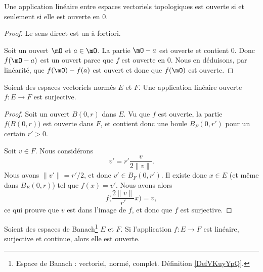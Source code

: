 \begin{lemma}
    Une application linéaire entre espaces vectoriels topologiques est ouverte si et seulement si elle est ouverte en \( 0\).
\end{lemma}

\begin{proof}
    Le sens direct est un à fortiori.

    Soit un ouvert \( \mO\) et \( a\in \mO\). La partie \( \mO-a\) est ouverte et contient \( 0\). Donc \( f(\mO-a)\) est un ouvert parce que \( f\) est ouverte en \( 0\). Nous en déduisons, par linéarité, que \( f(\mO)-f(a)\) est ouvert et donc que \( f(\mO)\) est ouverte.
\end{proof}

\begin{lemma}
    Soient des espaces vectoriels normés \( E\) et \( F\). Une application linéaire ouverte \( f\colon E\to F\) est surjective.
\end{lemma}

\begin{proof}
    Soit un ouvert \( B(0,r)\) dans \( E\). Vu que \( f\) est ouverte, la partie \( f\big( B(0,r) \big)\) est ouverte dans \( F\), et contient donc une boule \( B_F(0,r')\) pour un certain \( r'>0\).

    Soit \( v\in F\). Nous considérons
    \begin{equation}
        v'=r'\frac{ v }{ 2\| v \| }.
    \end{equation}
    Nous avons \( \| v' \|=r'/2\), et donc \( v'\in B_F(0,r')\). Il existe donc \( x\in E\) (et même dans \( B_E(0,r)\)) tel que \( f(x)=v'\). Nous avons alors
    \begin{equation}
        f\big( \frac{ 2\| v \| }{ r' }x \big)=v,
    \end{equation}
    ce qui prouve que \( v\) est dans l'image de \( f\), et donc que \( f\) est surjective.
\end{proof}

\begin{theorem}     \label{THOooATZKooXHWCRD}
    Soient des espaces de Banach\footnote{Espace de Banach : vectoriel, normé, complet. Définition \ref{DefVKuyYpQ}.} \( E\) et \( F\). Si l'application \( f\colon E\to F\) est linéaire, surjective et continue, alors elle est ouverte.
\end{theorem}

